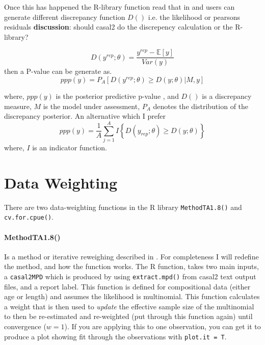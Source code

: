 \documentclass[12pt,preprint,authoryear]{article}
\begin{document}
Once this has happened the R-library function read that in and users can generate different discrepancy function \(D()\) i.e. the likelihood or pearsons residuals \textbf{discussion}: should casal2 do the discrepency calculation or the R-library?

\[
D\left(y^{rep}; \theta\right) = \frac{y^{rep} - \mathbb{E}[y]}{Var(y)}
\]
then a P-value can be generate as.
\[
ppp\left(y\right) = P_A\left[D\left(y^{rep}; \theta\right) \geq D\left(y;\theta\right) | M, y\right]
\]

where, \(ppp\left(y\right)\) is the posterior predictive p-value \cite{hjort2006post}, and \(D\left(\right)\) is a discrepancy measure, \(M\) is the model under assessment, \(P_A\) denotes the distribution of the discrepancy posterior. An alternative which I prefer
\[
ppp\left(y\right) = \frac{1}{A} \sum\limits_{j = 1}^A I \left\{D\left(y_{rep}; \theta\right) \geq D\left(y;\theta\right) \right\}
\]
where, \(I\) is an indicator function.

\section{Data Weighting}
There are two data-weighting functions in the R library \texttt{MethodTA1.8()} and \texttt{cv.for.cpue()}.


\paragraph*{MethodTA1.8()}
Is a method or iterative reweighing described in \cite{francis2011data}. For completeness I will redefine the method, and how the function works. The R function, takes two main inputs, a \texttt{casal2MPD} which is produced by using \texttt{extract.mpd()} from casal2 text output files, and a report label. This function is defined for compositional data (either age or length) and assumes the likelihood is multinomial. This function calculates a weight that is then used to \textit{update} the effective sample size of the multinomial to then be re-estimated and re-weighted (put through this function again) until convergence (\(w = 1\)). If you are applying this to one observation, you can get it to produce a plot showing fit through the observations with \texttt{plot.it = T}.
\end{document}
